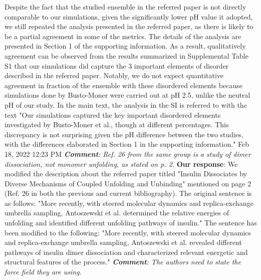 \documentclass[sn-vancouver]{sn-jnl}
\begin{document}
\newline
\indent
Despite the fact that the studied ensemble in the referred paper is not directly comparable to our simulations, given the significantly lower pH value it adopted, we still repeated the analysis presented in the referred paper, as there is likely to be a partial agreement in some of the metrics. The details of the analysis are presented in Section 1 of the supporting information. As a result, qualitatively agreement can be observed from the results summarized in Supplemental Table S1 that our simulations did capture the 3 important elements of disorder described in the referred paper. Notably, we do not expect quantitative agreement in fraction of the ensemble with these disordered elements because simulations done by Busto-Moner were carried out at pH 2.5, unlike the neutral pH of our study.  In the main text, the analysis in the SI is referred to with the text "Our simulations captured the key important disordered elements investigated by Busto-Moner et al., though at different percentages. This discrepancy is not surprising given the pH difference between the two studies, with the differences elaborated in Section 1 in the supporting information."
Feb 18, 2022 12:23 PM
\newline
\newline
\indent
\textit{\textbf{Comment}: Ref. 26 from the same group is a study of dimer dissociation, not monomer unfolding, as stated on p. 2.}
\newline
\indent
\textbf{Our response}: We modified the description about the referred paper titled "Insulin Dissociates by Diverse Mechanisms of Coupled Unfolding and Unbinding" mentioned on page 2 (Ref. 26 in both the previous and current bibliography). The original sentence is as follows:
\newline
"More recently, with steered molecular dynamics and replica-exchange umbrella sampling, Antoszewski et al. determined the relative energies of unfolding and identified different unfolding pathways of insulin."
\newline
The sentence has been modified to the following:
\newline 
"More recently, with steered molecular dynamics and replica-exchange umbrella sampling, Antoszewski et al. revealed different pathways of insulin dimer dissociation and characterized relevant energetic and structural features of the process."
\newline 
\newline
\indent
\textit{\textbf{Comment}: The authors need to state the force field they are using.}
\end{document}
